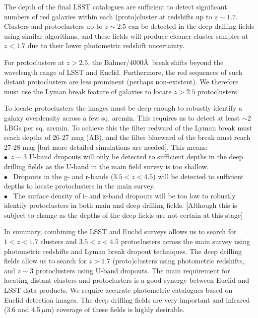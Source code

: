 \documentclass[a4paper,11pt]{article}
\begin{document}
The depth of the final LSST catalogues are sufficient to detect
significant numbers of red galaxies within each (proto)cluster at
redshifts up to $z\sim1.7$. Clusters and protoclusters up to
$z\sim2.5$ can be detected in the deep drilling fields using similar
algorithms, and these fields will produce cleaner cluster samples at
$z<1.7$ due to their lower photometric redshift uncertainty.

For protoclusters at $z>2.5$, the Balmer/$4000$\AA\ break shifts
beyond the wavelength range of LSST and Euclid. Furthermore, the red
sequences of such distant protoclusters are less prominent (perhaps
non-existent). We therefore must use the Lyman break feature of
galaxies to locate $z>2.5$ protoclusters.

To locate protoclusters the images must be deep enough to robustly
identify a galaxy overdensity across a few sq. arcmin. This requires
us to detect at least $\sim2$ LBGs per sq. arcmin. To achieve this the
filter redward of the Lyman break must reach depths of 26-27 mag (AB),
and the filter blueward of the break must reach 27-28 mag [but more
  detailed simulations are needed]. This means:\\
\noindent $\bullet$~$z\sim3$ U-band dropouts will only be detected to
sufficient depths in the deep drilling fields as the U-band in the
main field survey is too shallow. \\
\noindent $\bullet$ ~Dropouts in the g- and r-bands ($3.5<z<4.5$) will
be detected to sufficient depths to locate protoclusters in the main
survey. \\
\noindent $\bullet$ ~The surface density of i- and z-band dropouts
will be too low to robustly identify protoclusters in both main and
deep drilling fields. [Although this is subject to change as the
  depths of the deep fields are not certain at this stage]

In summary, combining the LSST and Euclid surveys allows us to search
for $1<z<1.7$ clusters and $3.5<z<4.5$ protoclusters across the main
survey using photometric redshifts and Lyman break dropout
techniques. The deep drilling fields allow us to search for $z>1.7$
(proto)clusters using photometric redshifts, and $z\sim3$
protoclusters using U-band dropouts. The main requirement for locating
distant clusters and protoclusters is a good synergy between Euclid
and LSST data products. We require accurate photometric catalogues
based on Euclid detection images. The deep drilling fields are very
important and infrared (3.6 and 4.5\,$\mu$m) coverage of these fields
is highly desirable.
\end{document}
